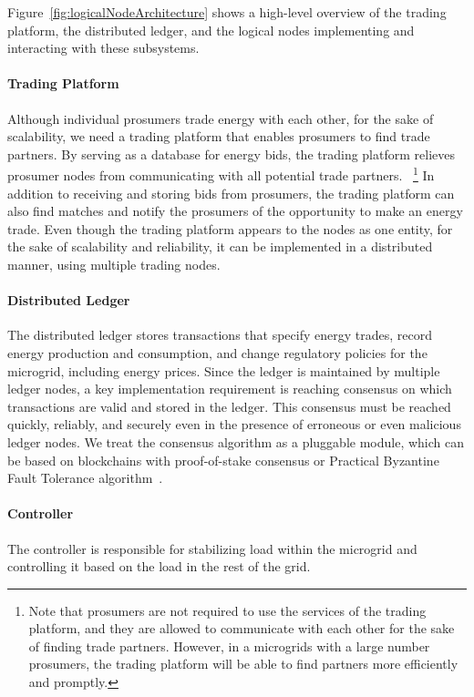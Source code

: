 \documentclass[sigconf]{acmart}
\begin{document}
Figure~\ref{fig:logicalNodeArchitecture} shows a high-level overview of the trading platform, the distributed ledger, and the logical nodes implementing and interacting with these subsystems.

\paragraph{Trading Platform}
Although individual prosumers trade energy with each other, for the sake of scalability, we need a trading platform that enables prosumers to find trade partners.
By serving as a database for energy bids, the trading platform relieves prosumer nodes from communicating with all potential trade partners.~%
\footnote{Note that prosumers are not required to use the services of the trading platform, and they are allowed to communicate with each other for the sake of finding trade partners.
However, in a microgrids with a large number prosumers, the trading platform will be able to find partners more efficiently and promptly.}
In addition to receiving and storing bids from prosumers, the trading platform can also find matches and notify the prosumers of the opportunity to make an energy trade.
Even though the trading platform appears to the nodes as one entity, for the sake of scalability and reliability, it can be implemented in a distributed manner, using multiple trading nodes.

\paragraph{Distributed Ledger}
The distributed ledger stores transactions that specify energy trades, record energy production and consumption, and change regulatory policies for the microgrid, including energy prices.
Since the ledger is maintained by multiple ledger nodes, a key implementation requirement is reaching consensus on which transactions are valid and stored in the ledger.
This consensus must be reached quickly, reliably, and securely even in the presence of erroneous or even malicious ledger nodes.
We treat the consensus algorithm as a pluggable module, which can be based on blockchains with proof-of-stake consensus or Practical Byzantine Fault Tolerance algorithm~\cite{castro1999practical}.

\paragraph{Controller}
The controller is responsible for stabilizing load within the microgrid and controlling it based on the load in the rest of the grid.
 
\end{document}
